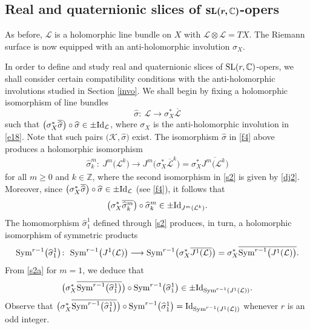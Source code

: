 \documentclass[10pt,a4paper]{amsart}
\numberwithin{equation}{section}
\begin{document}
\subsection[Real and quaternionic slices of SL(r,C)-opers]{Real and quaternionic slices of $\boldsymbol{{\rm SL}(r,\mathbb{C})}$-opers}

As before, $\mathcal L$ is a holomorphic line bundle on $X$ with ${\mathcal L}\otimes {\mathcal L} = TX$.
The Riemann surface is now equipped with an anti-holomorphic involution $\sigma_X$.

In order to define and study real and quaternionic slices of ${\rm SL}(r,\mathbb{C})$-opers, we shall consider certain
compatibility conditions with the anti-holomorphic involutions studied in Section \ref{invo}.
We shall begin by fixing a holomorphic isomorphism of line bundles
\begin{equation}\label{f4}
\widehat{\sigma}\colon\ {\mathcal L} \longrightarrow \sigma^*_X \overline{\mathcal L}
\end{equation}
such that $\bigl(\sigma^*_X \overline{\widehat{\sigma}}\bigr)\circ\widehat{\sigma} \in \pm {\rm Id}_{\mathcal L}$,
where $\sigma_X$ is the anti-holomorphic involution in \eqref{e18}. Note that such pairs $\bigl({\mathcal K}, \widehat{\sigma}\bigr)$
exist. The isomorphism $\widehat{\sigma}$ in \eqref{f4} above produces a holomorphic isomorphism%
\begin{gather}\label{s2}
\widehat{\sigma}^m_k\colon\ J^m\bigl({\mathcal L}^k\bigr) \longrightarrow
J^m\bigl(\sigma^*_X \overline{\mathcal L}^k\bigr)
 = \sigma^*_X \overline{J^m\bigl({\mathcal L}^k\bigr)}
\end{gather}
for all $m \geq 0$ and $k \in \mathbb Z$, where the second isomorphism in \eqref{s2} is given by
\eqref{dj2}. Moreover, since $\bigl(\sigma^*_X \overline{\widehat{\sigma}}\bigr)
\circ\widehat{\sigma} \in \pm {\rm Id}_{\mathcal L}$ (see \eqref{f4}), it follows that
\begin{equation}\label{s2a}
\bigl(\sigma^*_X \overline{\widehat{\sigma}^m_k}\bigr)\circ\widehat{\sigma}^m_k \in \pm {\rm Id}_{J^m({\mathcal L}^k)}.
\end{equation}
The homomorphism $\widehat{\sigma}^1_1$ defined through \eqref{s2} produces, in turn, a
holomorphic isomorphism of symmetric products
\begin{equation}\label{f5}
{\rm Sym}^{r-1}\bigl(\widehat{\sigma}^1_1\bigr)\colon\ {\rm Sym}^{r-1}\bigl(J^1(\mathcal L)\bigr)
\longrightarrow {\rm Sym}^{r-1}\bigl(\sigma^*_X
\overline{J^1(\mathcal L)}\bigr) = \sigma^*_X\overline{{\rm Sym}^{r-1}\bigl(J^1({\mathcal L})\bigr)}.
\end{equation}
{}From \eqref{s2a} for $m = 1$, we deduce that
\[
\bigl(\sigma^*_X \overline{{\rm Sym}^{r-1}\bigl(\widehat{\sigma}^1_1\bigr)}\bigr)\circ{\rm Sym}^{r-1}\bigl(\widehat{\sigma}^1_1\bigr) \in
\pm {\rm Id}_{{\rm Sym}^{r-1}(J^1(\mathcal L))}.
\]
Observe that $\bigl(\sigma^*_X \overline{{\rm Sym}^{r-1}\bigl(\widehat{\sigma}^1_1\bigr)}\bigr)\circ
{\rm Sym}^{r-1}\bigl(\widehat{\sigma}^1_1\bigr) =
{\rm Id}_{{\rm Sym}^{r-1}(J^1(\mathcal L))}$ whenever $r$ is an odd integer.
\end{document}

